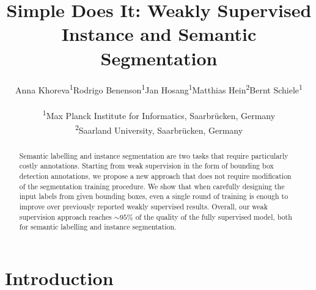 \documentclass[10pt,english,british,twocolumn]{article}
\begin{document}
\let\originalparagraph\paragraph 
\renewcommand{\paragraph}[2][.]{\originalparagraph{#2#1}}

\title{Simple Does It: Weakly Supervised Instance and Semantic Segmentation}

\author{Anna Khoreva\textsuperscript{1}\hspace{1.5em}Rodrigo Benenson\textsuperscript{1}\hspace{1.5em}Jan Hosang\textsuperscript{1}\hspace{1.5em}Matthias Hein\textsuperscript{2}\hspace{1.5em}Bernt
Schiele\textsuperscript{1}\\\\\textsuperscript{1}Max Planck Institute
for Informatics, Saarbr{\"u}cken, Germany\\ \textsuperscript{2}Saarland University,
Saarbr{\"u}cken, Germany}
\maketitle
\vspace{-0.5em}
\maketitle
\begin{abstract}
Semantic labelling and instance segmentation are two tasks that require
particularly costly annotations. Starting from weak supervision in
the form of bounding box detection annotations, we propose a new approach
that does not require modification of the segmentation training procedure.
We show that when carefully designing the input labels from given
bounding boxes, even a single round of training is enough to improve
over previously reported weakly supervised results. Overall, our weak
supervision approach reaches $\sim\!95\%$ of the quality of the fully
supervised model, both for semantic labelling and instance segmentation.
\end{abstract}

\section{\label{sec:Introduction}Introduction}
\end{document}
